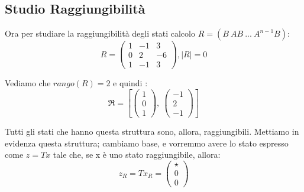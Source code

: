 \documentclass{article}
\begin{document}
\subsection{Studio Raggiungibilità}
Ora per studiare la raggiungibilità degli stati calcolo $R = (B\ AB\ ...\ A^{n-1}B)$: \[ R = \left(\begin{matrix}1 & -1 & 3\\0 & 2 & -6\\1 & -1 & 3\end{matrix}\right), |R| = 0 \] 

Vediamo che $rango(R) = 2$ e quindi : \[ \mathfrak{R} = \left[ \left(\begin{matrix}1\\0\\1\end{matrix}\right), \  \left(\begin{matrix}-1\\2\\-1\end{matrix}\right)\right] \]

Tutti gli stati che hanno questa struttura sono, allora, raggiungibili. Mettiamo in evidenza questa struttura;
cambiamo base, e vorremmo avere lo stato espresso come $z = Tx$ tale che, se x è uno stato raggiungibile, allora: \[ z_R = T x_R = \begin{pmatrix} \star  \\ 0 \\0\end{pmatrix}\]
\end{document}
